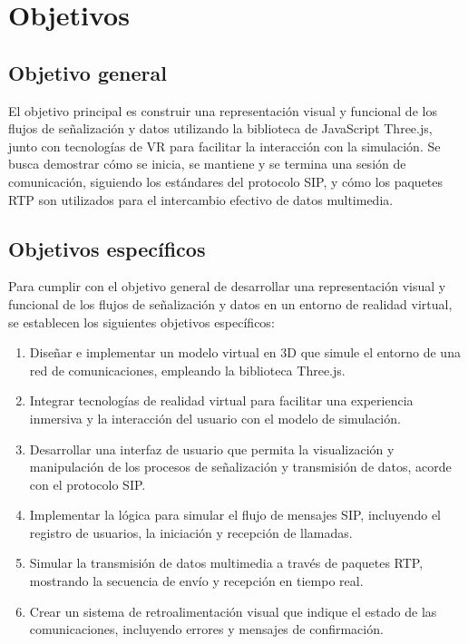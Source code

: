 \documentclass[a4paper, 12pt]{book}
\begin{document}
\cleardoublepage %
\chapter{Objetivos} %
\label{chap:objetivos} %

\section{Objetivo general} %
\label{sec:objetivo-general} %

El objetivo principal es construir una representación visual y funcional de los flujos de señalización y 
datos utilizando la biblioteca de JavaScript Three.js, junto con tecnologías de VR para facilitar la interacción con la simulación. 
Se busca demostrar cómo se inicia, se mantiene y se termina una sesión de comunicación, siguiendo los estándares del protocolo SIP, 
y cómo los paquetes RTP son utilizados para el intercambio efectivo de datos multimedia.


\section{Objetivos específicos}
\label{sec:objetivos-especificos}
Para cumplir con el objetivo general de desarrollar una representación visual y funcional de los flujos de señalización 
y datos en un entorno de realidad virtual, se establecen los siguientes objetivos específicos:

\begin{enumerate}
\item Diseñar e implementar un modelo virtual en 3D que simule el entorno de una red de comunicaciones, empleando la biblioteca Three.js.
\item Integrar tecnologías de realidad virtual para facilitar una experiencia inmersiva y 
la interacción del usuario con el modelo de simulación.
\item Desarrollar una interfaz de usuario que permita la visualización y manipulación de los procesos de 
señalización y transmisión de datos, acorde con el protocolo SIP.
\item Implementar la lógica para simular el flujo de mensajes SIP, incluyendo el registro de usuarios, la iniciación y 
recepción de llamadas.
\item Simular la transmisión de datos multimedia a través de paquetes RTP, mostrando la secuencia de envío y recepción en tiempo real.
\item Crear un sistema de retroalimentación visual que indique el estado de las comunicaciones, incluyendo errores y mensajes de confirmación.
\end{enumerate}
\end{document}
